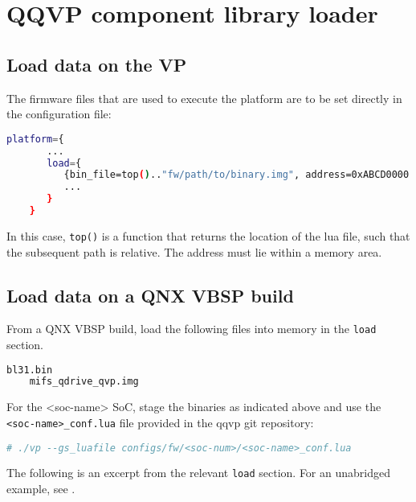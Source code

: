 \clearpage
\section{QQVP component library loader}

\subsection{Load data on the VP}
\label{sec:load-data-on-vp}

The firmware files that are used to execute the platform are to be set directly in the configuration file:

\small
\begin{lstlisting}[language=bash]
    platform={
       ...
       load={
          {bin_file=top().."fw/path/to/binary.img", address=0xABCD0000 };
          ...
       }
    }
\end{lstlisting}
\normalsize

In this case, {\small{\lstinline!top()!}} is a function that returns the location of the lua file, such that the subsequent path is relative. The address must lie within a memory area.


\subsection{Load data on a QNX VBSP build}

From a QNX VBSP build, load the following files into memory in the {\small{\lstinline!load!}} section.

\small
\begin{lstlisting}[language=bash]
    bl31.bin
    mifs_qdrive_qvp.img
\end{lstlisting}
\normalsize

For the <soc-name> SoC, stage the binaries as indicated above and use the {\small{\lstinline!<soc-name>_conf.lua!}} file provided in the qqvp git repository:

\small
\begin{lstlisting}[language=bash]
    # ./vp --gs_luafile configs/fw/<soc-num>/<soc-name>_conf.lua
\end{lstlisting}
\normalsize


The following is an excerpt from the relevant {\small{\lstinline!load!}} section. For an unabridged example, see {}.

